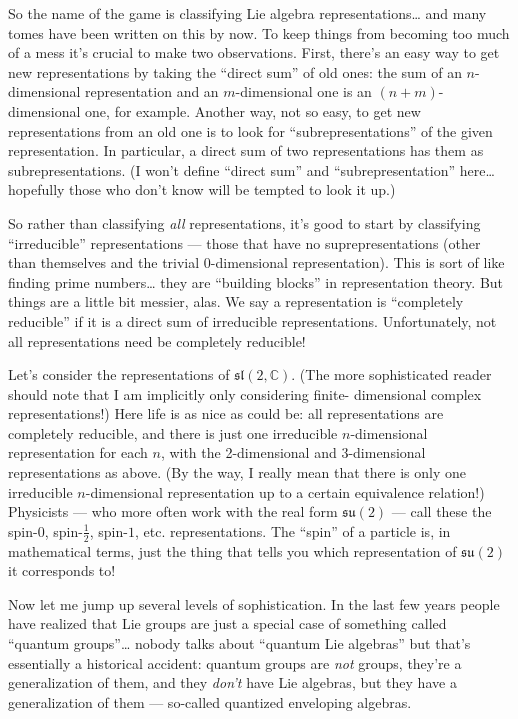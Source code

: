 \documentclass{article}
\begin{document}
So the name of the game is classifying Lie algebra
representations\ldots{} and many tomes have been written on this by now.
To keep things from becoming too much of a mess it's crucial to make two
observations. First, there's an easy way to get new representations by
taking the ``direct sum'' of old ones: the sum of an \(n\)-dimensional
representation and an \(m\)-dimensional one is an \((n+m)\)-dimensional
one, for example. Another way, not so easy, to get new representations
from an old one is to look for ``subrepresentations'' of the given
representation. In particular, a direct sum of two representations has
them as subrepresentations. (I won't define ``direct sum'' and
``subrepresentation'' here\ldots{} hopefully those who don't know will
be tempted to look it up.)

So rather than classifying \emph{all} representations, it's good to
start by classifying ``irreducible'' representations --- those that have
no suprepresentations (other than themselves and the trivial
0-dimensional representation). This is sort of like finding prime
numbers\ldots{} they are ``building blocks'' in representation theory.
But things are a little bit messier, alas. We say a representation is
``completely reducible'' if it is a direct sum of irreducible
representations. Unfortunately, not all representations need be
completely reducible!

Let's consider the representations of \(\mathfrak{sl}(2,\mathbb{C})\).
(The more sophisticated reader should note that I am implicitly only
considering finite- dimensional complex representations!) Here life is
as nice as could be: all representations are completely reducible, and
there is just one irreducible \(n\)-dimensional representation for each
\(n\), with the 2-dimensional and \(3\)-dimensional representations as
above. (By the way, I really mean that there is only one irreducible
\(n\)-dimensional representation up to a certain equivalence relation!)
Physicists --- who more often work with the real form
\(\mathfrak{su}(2)\) --- call these the spin-\(0\), spin-\(\frac{1}{2}\),
spin-\(1\), etc. representations. The ``spin'' of a particle is, in
mathematical terms, just the thing that tells you which representation
of \(\mathfrak{su}(2)\) it corresponds to!

Now let me jump up several levels of sophistication. In the last few
years people have realized that Lie groups are just a special case of
something called ``quantum groups''\ldots{} nobody talks about ``quantum
Lie algebras'' but that's essentially a historical accident: quantum
groups are \emph{not} groups, they're a generalization of them, and they 
\emph{don't} have Lie algebras, but they have a generalization of them --- so-called
quantized enveloping algebras.
\end{document}
